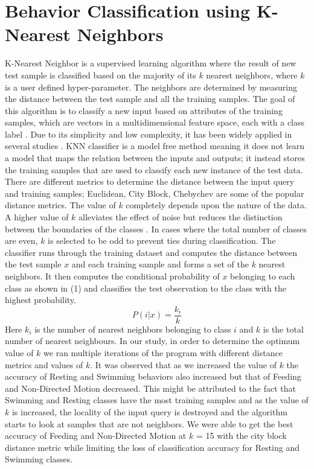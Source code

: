 \documentclass[conference]{IEEEtran}
\begin{document}
\section{Behavior Classification using K-Nearest Neighbors}
K-Nearest Neighbor is a supervised learning algorithm where the result of new test sample is classified based on the majority of its $k$ nearest neighbors, where $k$ is a user defined hyper-parameter. The neighbors are determined by measuring the distance between the test sample and all the training samples. The goal of this algorithm is to classify a new input based on attributes of the training samples, which are vectors in a multidimensional feature space, each with a class label \cite{rosati}. Due to its simplicity and low complexity, it has been widely applied in several studies \cite{jan1, rosati, jan2}. KNN classifier is a model free method meaning it does not learn a model that maps the relation between the inputs and outputs; it instead stores the training samples that are used to classify each new instance of the test data\cite{zhang}. There are different metrics to determine the distance between the input query and training samples; Euclidean, City Block, Chebychev are some of the popular distance metrics. The value of $k$ completely depends upon the nature of the data. A higher value of $k$ alleviates the effect of noise but reduces the distinction between the boundaries of the classes \cite{rosati}. In cases where the total number of classes are even, $k$ is selected to be odd to prevent ties during classification. 
The classifier runs through the training dataset and computes the distance between the test sample $x$ and each training sample and forms a set of the $k$ nearest neighbors. It then computes the conditional probability of $x$ belonging to each class as shown in (1) and classifies the test observation to the class with the highest probability.
\begin{equation}
P(i|x) = \frac{k_i}{k}
\end{equation}
Here $k_i$ is the number of nearest neighbors belonging to class $i$ and $k$ is the total number of nearest neighbours. In our study, in order to determine the optimum value of $k$ we ran multiple iterations of the program with different distance metrics and values of $k$. It was observed that as we increased the value of $k$ the accuracy of Resting and Swimming behaviors also increased but that of Feeding and Non-Directed Motion decreased. This might be attributed to the fact that Swimming and Resting classes have the most training samples and as the value of $k$ is increased, the locality of the input query is destroyed and the algorithm starts to look at samples that are not neighbors.  We were able to get the best accuracy of Feeding and Non-Directed Motion at $k$ = 15 with the city block distance metric while limiting the loss of classification  accuracy for Resting and Swimming classes.
\end{document}
